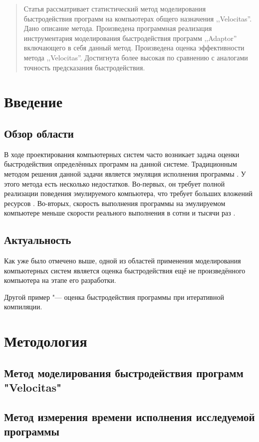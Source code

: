\documentclass{disser}
\begin{document}
\begin{abstract}
Статья рассматривает статистический метод моделирования быстродействия программ на компьютерах общего назначения ,,Velocitas''. Дано описание метода. Произведена программная реализация инструментария моделирования быстродействия программ ,,Adaptor'' включающего в себя данный метод. Произведена оценка эффективности метода ,,Velocitas''. Достигнута более высокая по сравнению с аналогами точность предсказания быстродействия.
\end{abstract}

\section*{Введение}
\subsection*{Обзор области}
В ходе проектирования компьютерных систем часто возникает задача оценки быстродействия определённых программ на данной системе. Традиционным методом решения данной задачи является эмуляция исполнения программы \cite{emulation}. У этого метода есть несколько недостатков. Во-первых, он требует полной реализации поведения эмулируемого компьютера, что требует больших вложений ресурсов \cite{emulation-complexity}. Во-вторых, скорость выполнения программы на эмулируемом компьютере меньше скорости реального выполнения в сотни и тысячи раз \cite{emulation-speed}.
\subsection*{Актуальность}
Как уже было отмечено выше, одной из областей применения моделирования компьютерных систем является оценка быстродействия ещё не произведённого компьютера на этапе его разработки.

Другой пример "--- оценка быстродействия программы при итеративной компиляции.
\section{Методология}
\subsection{Метод моделирования быстродействия программ "Velocitas"}

\subsection{Метод измерения времени исполнения исследуемой программы}
\end{document}
